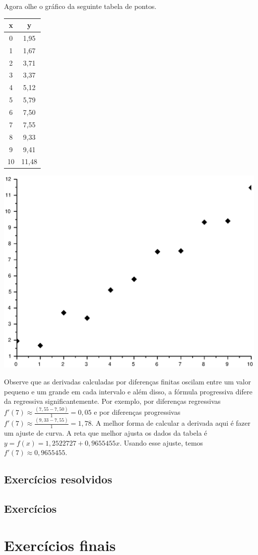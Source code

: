 Agora olhe o gráfico da seguinte tabela de pontos.
\begin{center}
\begin{tabular}{|c|c|}
\hline
x&y\\
\hline
0    & 1,95  \\
\hline
    1&     1,67  \\
		\hline
    2 &    3,71  \\
		\hline
    3  &   3,37  \\
		\hline
    4   &  5,12   \\
		\hline
    5&     5,79  \\
		\hline
    6 &    7,50  \\
		\hline
    7  &   7,55  \\
		\hline
    8   &  9,33  \\
		\hline
    9   &  9,41   \\
		\hline
    10  &  11,48  \\
		\hline
\end{tabular}  
\end{center}
\begin{center}
\includegraphics[scale=0.5]{./cap_derivacao/pics/graf_der.eps}
\end{center}

Observe que as derivadas calculadas por diferenças finitas oscilam entre um valor pequeno e um grande em cada intervalo e além disso, a fórmula progressiva difere da regressiva significantemente. Por exemplo, por diferenças regressivas $f'(7)\approx \frac{(7,55 -  7,50)}{1}=0,05$ e por diferenças progressivas $f'(7)\approx \frac{(9,33 -  7,55)}{1}=1,78$. A melhor forma de calcular a derivada aqui é fazer um ajuste de curva. A reta que melhor ajusta os dados da tabela é $y=f(x)=1,2522727+0,9655455x$. Usando esse ajuste, temos $f'(7)\approx 0,9655455$.

\subsection*{Exercícios resolvidos}

\emconstrucao

\subsection*{Exercícios}

\emconstrucao


\section{Exercícios finais}

\emconstrucao
